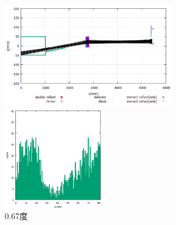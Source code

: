 \begin{figure}[H]
\begin{minipage}{0.50\hsize}
\begin{center}
\includegraphics[height=4.5cm]{angle/poltwosim.png}
\end{center}
\end{minipage}
\begin{minipage}{0.50\hsize}
\begin{center}
\includegraphics[height=4.5cm]{angle/poltwoex.png}
\end{center}
\end{minipage}
\caption{0.67度}
\end{figure}

